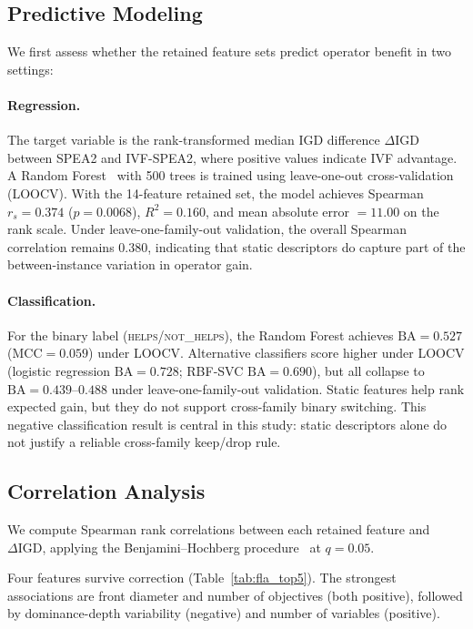 \documentclass[runningheads]{llncs}
\begin{document}
\subsection{Predictive Modeling}
\label{sec:fla_prediction}

We first assess whether the retained feature sets predict operator
benefit in two settings:

\paragraph{Regression.}
The target variable is the rank-transformed median IGD difference
$\Delta\mathrm{IGD}$ between SPEA2 and IVF-SPEA2, where positive values
indicate IVF advantage.
A Random Forest~\cite{breiman2001random} with 500 trees is trained using leave-one-out
cross-validation (LOOCV). With the 14-feature retained set, the model
achieves Spearman $r_s = 0.374$ ($p = 0.0068$), $R^{2} = 0.160$, and
mean absolute error $= 11.00$ on the rank scale. Under
leave-one-family-out validation, the overall Spearman correlation remains
$0.380$, indicating that static descriptors do capture part of the
between-instance variation in operator gain.

\paragraph{Classification.}
For the binary label (\textsc{helps}/\textsc{not\_helps}), the Random
Forest achieves $\mathrm{BA} = 0.527$ ($\mathrm{MCC} = 0.059$) under LOOCV.
Alternative classifiers score higher under LOOCV (logistic regression
$\mathrm{BA}\!=\!0.728$; RBF-SVC $\mathrm{BA}\!=\!0.690$), but all collapse
to $\mathrm{BA}\!=\!0.439$--$0.488$ under leave-one-family-out validation.
Static features help rank expected gain, but they do not support cross-family
binary switching. This negative classification result is central in this
study: static descriptors alone do not justify a reliable cross-family
keep/drop rule.

\subsection{Correlation Analysis}
\label{sec:fla_correlation}

We compute Spearman rank correlations between each retained feature and
$\Delta\mathrm{IGD}$, applying the Benjamini--Hochberg
procedure~\cite{benjamini1995controlling} at $q = 0.05$.

Four features survive correction (Table~\ref{tab:fla_top5}). The strongest
associations are front diameter and number of objectives (both positive),
followed by dominance-depth variability (negative) and number of variables
(positive).
\end{document}
